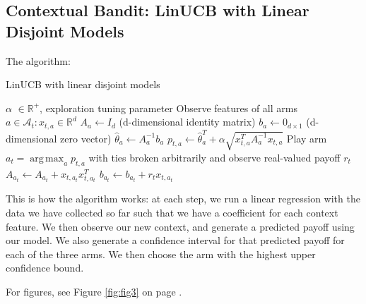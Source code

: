 \documentclass[nojss]{jss}\usepackage[]{graphicx}\usepackage[]{color}
\DeclareMathOperator*{\argmax}{arg\,max}
\begin{document}
\subsection{Contextual Bandit: LinUCB with Linear Disjoint Models}

The algorithm:

\begin{algorithm}
\caption{LinUCB with linear disjoint models}
\label{Alg:LinUCBDisjoint}
\begin{algorithmic}
\REQUIRE $\alpha$ \(  \in \mathbb{R}^{+} \), exploration tuning parameter
          \STATE Observe features of all arms \(  a \in \mathcal{A}_{t}: x_{t,a} \in \mathbb{R}^{d}\)
		      \STATE \(A_{a} \leftarrow I_{d}  \)  (d-dimensional identity matrix)
		      \STATE \(b_{a} \leftarrow 0_{d\times1}   \) (d-dimensional zero vector)
		\ENDIF
		\STATE \( \hat{\theta}_{a} \leftarrow A_{a}^{-1}b_{a} \)
		\STATE \( p_{t,a} \leftarrow \hat{\theta}_{a}^{T} + \alpha  \sqrt{ x_{t,a}^{T} A_{a}^{-1}x_{t,a}} \)
	\ENDFOR
	\STATE Play arm \(a_t = \argmax_a  p_{t,a}  \) with ties broken arbitrarily and observe real-valued payoff $r_t$
           \STATE \( A_{a_{t}} \leftarrow A_{a_{t}}+ x_{t,a_{t}}x_{t,a_{t}}^{T} \)
           \STATE  \( b_{a_{t}} \leftarrow b_{a_{t}}+ r_{t}x_{t,a_{t}}  \)
\ENDFOR
\end{algorithmic}
\end{algorithm}

This is how the algorithm works: at each step, we run a linear regression with the data we have collected so far such that we have a coefficient for each context feature. We then observe our new context, and generate a predicted payoff using our model. We also generate a confidence interval for that predicted payoff for each of the three arms. We then choose the arm with the highest upper confidence bound.

For figures, see Figure \ref{fig:fig3} on page \pageref{fig:fig3}.
\end{document}
